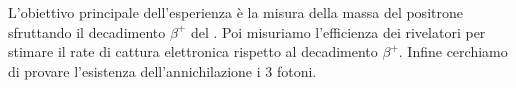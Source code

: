 L'obiettivo principale dell'esperienza è la misura della massa del positrone sfruttando il decadimento $\beta^+$ del \na{}. Poi misuriamo l'efficienza dei rivelatori per stimare il rate di cattura elettronica rispetto al decadimento $\beta^+$. Infine cerchiamo di provare l'esistenza dell'annichilazione i 3 fotoni.